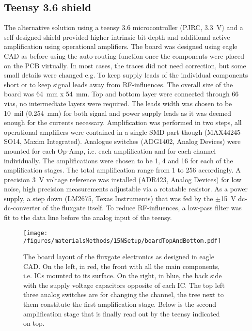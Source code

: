         \subsection{Teensy 3.6 shield}
        \label{sec:matMeth:teensyShield}
            The alternative solution using a teensy 3.6 microcontroller (PJRC, \SI{3.3}{\volt}) and a self designed shield provided higher intrinsic bit depth and additional active amplification using operational amplifiers.  The board was designed using eagle CAD as before using the auto-routing function once the components were placed on the PCB virtually.  In most cases, the traces did not need correction, but some small details were changed e.g.  To keep supply leads of the individual components short or to keep signal leads away from RF-influences.  The overall size of the board was \SI{64}{\mm} x \SI{54}{\mm}.  Top and bottom layer were connected through 66 vias, no intermediate layers were required.  The leads width was chosen to be \SI{10}{mil} (\SI{0.254}{\mm}) for both signal and power supply leads as it was deemed enough for the currents necessary. 
            Amplification was performed in two steps, all operational amplifiers were contained in a single SMD-part though (MAX44245-SO14, Maxim Integrated). Analogue switches (ADG1402, Analog Devices) were mounted for each Op-Amp, i.e. each amplification and for each channel individually. The amplifications were chosen to be 1, 4 and 16 for each of the amplification stages. The total amplification range from 1 to 256 accordingly. A precision \SI{3}{\volt} voltage reference was installed (ADR423, Analog Devices) for low noise, high precision measurements adjustable via a rotatable resistor. As a power supply, a step down (LM2675, Texas Instruments) that was fed by the $\pm$\SI{15}{\volt} dc-dc-converter of the fluxgate itself. To reduce RF-influences, a low-pass filter was fit to the data line before the analog input of the teensy. 
            \begin{figure}
                \texttt{[image: /figures/materialsMethods/15NSetup/boardTopAndBottom.pdf]}
                \caption[Fluxgate board layout]{The board layout of the fluxgate electronics as designed in eagle CAD. On the left, in red, the front with all the main components, i.e. ICs mounted to its surface. On the right, in blue, the back side with the supply voltage capacitors opposite of each IC. The top left three analog switches are for changing the channel, the tree next to them constitute the first amplification stage. Below is the second amplification stage that is finally read out by the teensy indicated on top.}
                \label{fig:materialsMethods:fluxgateBoard}
            \end{figure}
